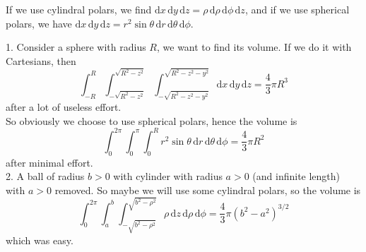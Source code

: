 \begin{example}
    If we use cylindral polars, we find $\mathrm dx\,\mathrm dy\,\mathrm dz=\rho\,\mathrm d\rho\,\mathrm d\phi\,\mathrm dz$, and if we use spherical polars, we have $\mathrm dx\,\mathrm dy\,\mathrm dz=r^2\sin\theta\,\mathrm dr\,\mathrm d\theta\,\mathrm d\phi$.
\end{example}
\begin{example}
    1. Consider a sphere with radius $R$, we want to find its volume.
    If we do it with Cartesians, then
    $$\int_{-R}^R\int_{-\sqrt{R^2-z^2}}^{\sqrt{R^2-z^2}}\int_{-\sqrt{R^2-z^2-y^2}}^{\sqrt{R^2-z^2-y^2}}\mathrm dx\,\mathrm dy\,\mathrm dz=\frac{4}{3}\pi R^3$$
    after a lot of useless effort.\\
    So obviously we choose to use spherical polars, hence the volume is
    $$\int_0^{2\pi}\int_0^\pi\int_0^{R}r^2\sin\theta\,\mathrm dr\,\mathrm d\theta\,\mathrm d\phi=\frac{4}{3}\pi R^2$$
    after minimal effort.\\
    2. A ball of radius $b>0$ with cylinder with radius $a>0$ (and infinite length) with $a>0$ removed.
    So maybe we will use some cylindral polars, so the volume is
    $$\int_0^{2\pi}\int_a^b\int_{-\sqrt{b^2-\rho^2}}^{\sqrt{b^2-\rho^2}}\rho\,\mathrm dz\,\mathrm d\rho\,\mathrm d\phi=\frac{4}{3}\pi(b^2-a^2)^{3/2}$$
    which was easy.
\end{example}